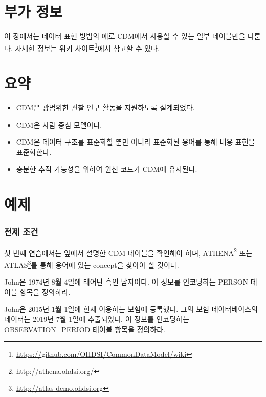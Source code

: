 \documentclass[10.5pt]{book}
\let\rmarkdownfootnote\footnote%
\def\footnote{\protect\rmarkdownfootnote}
\theoremstyle{definition}
\theoremstyle{definition}
\theoremstyle{definition}
\theoremstyle{remark}
\let\BeginKnitrBlock\begin \let\EndKnitrBlock\end
\begin{document}
\section{부가 정보}\label{-}

이 장에서는 데이터 표현 방법의 예로 CDM에서 사용할 수 있는 일부
테이블만을 다룬다. 자세한 정보는 위키 사이트\footnote{\url{https://github.com/OHDSI/CommonDataModel/wiki}}에서
참고할 수 있다.

\section{요약}\label{-2}

\BeginKnitrBlock{rmdsummary}
\begin{itemize}
\item
  CDM은 광범위한 관찰 연구 활동을 지원하도록 설계되었다.
\item
  CDM은 사람 중심 모델이다.
\item
  CDM은 데이터 구조를 표준화할 뿐만 아니라 표준화된 용어를 통해 내용
  표현을 표준화한다.
\item
  충분한 추적 가능성을 위하여 원천 코드가 CDM에 유지된다.
\end{itemize}
\EndKnitrBlock{rmdsummary}

\section{예제}

\subsubsection*{전제 조건}\label{-}

첫 번째 연습에서는 앞에서 설명한 CDM 테이블을 확인해야 하며,
ATHENA\footnote{\url{http://athena.ohdsi.org/}} 또는 ATLAS\footnote{\url{http://atlas-demo.ohdsi.org}}를
통해 용어에 있는 concept을 찾아야 할 것이다.

\BeginKnitrBlock{exercise}
\protect\hypertarget{exr:exerciseJohnPerson}{}{\label{exr:exerciseJohnPerson}
}John은 1974년 8월 4일에 태어난 흑인 남자이다. 이 정보를 인코딩하는
PERSON 테이블 항목을 정의하라.
\EndKnitrBlock{exercise}

\BeginKnitrBlock{exercise}
\protect\hypertarget{exr:exerciseJohnOp}{}{\label{exr:exerciseJohnOp}
}John은 2015년 1월 1일에 현재 이용하는 보험에 등록했다. 그의 보험
데이터베이스의 데이터는 2019년 7월 1일에 추출되었다. 이 정보를
인코딩하는 OBSERVATION\_PERIOD 테이블 항목을 정의하라.
\EndKnitrBlock{exercise}
\end{document}
